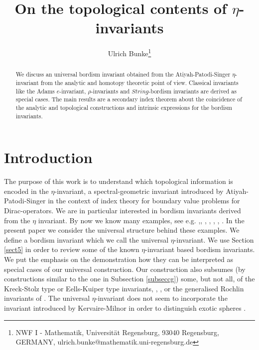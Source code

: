 \documentclass[12pt]{article}
\title{On the topological contents of $\eta$-invariants}
\author{Ulrich Bunke\thanks{NWF I - Mathematik,
Universit{\"a}t Regensburg,
93040 Regensburg,
GERMANY, ulrich.bunke@mathematik.uni-regensburg.de}}
\begin{document}
\maketitle



\begin{abstract}
We discuss an universal bordism invariant obtained from the Atiyah-Patodi-Singer $\eta$-invariant from the analytic and homotopy theoretic point of view.
Classical invariants like the Adams $e$-invariant, $\rho$-invariants and $String$-bordism invariants are derived as special cases. The main results are a secondary index theorem about the coincidence of the analytic and topological constructions and intrinsic expressions for the bordism invariants.
\end{abstract}

\tableofcontents

\section{Introduction}\label{subsecintro}

 
The purpose of this work is to understand which topological information is encoded in  the $\eta$-invariant,
a spectral-geometric invariant introduced by 
Atiyah-Patodi-Singer  \cite{MR0397797} in the context of index theory for boundary value problems for Dirac-operators. We are in particular interested in bordism invariants derived from the 
  $\eta$ invariant. By now we know  many examples, see e.g. \cite{MR0397799},\cite{MR870805}, \cite{MR883375}, \cite{2009arXiv0912.4875B},  \cite{MR762355}, \cite{westburyjones}, \cite{2010arXiv1012.5237C}.  %
   In the present paper we consider the universal structure behind these examples. We define a bordism invariant which we call the universal $\eta$-invariant. We use Section \ref{sect5} in order to review some of the known $\eta$-invariant based bordism invariants. We put the emphasis on the demonstration  how they can be interpreted as special cases of our universal construction.  
 Our construction also subsumes (by constructions similar to the one in  Subsection \ref{subseccg})  some, but not all, of the    Kreck-Stolz type or Eells-Kuiper type invariants, \cite{MR932303}, \cite{MR0372929}, or the generalised Rochlin invariants of \cite{MR889873}.  The universal $\eta$-invariant does not seem  to incorporate the invariant introduced by Kervaire-Milnor
in order to distinguish exotic spheres \cite{MR0148075}. 
   
\end{document}
